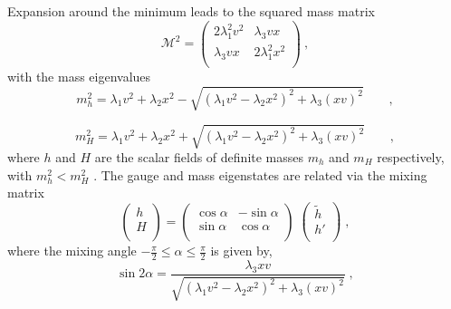\newline
Expansion around the minimum leads to the squared mass matrix
\newline
\begin{equation}
{\mathcal M}^2 = \left(
\begin{array}{cc}
2 \lambda_1^2 v^2 & \lambda_3 vx  \\
\lambda_3 vx & 2 \lambda_1^2 x^2 \\
\end{array}
\right)
\: , \end{equation}
\newline
with the mass eigenvalues
\begin{equation}
 m_h^2=  \lambda_1 v^2 + \lambda_2 x^2 -\sqrt{(\lambda_1 v^2 - \lambda_2 x^2)^2 +\lambda_3 (xv)^2 } \qquad,  \end{equation}

\begin{equation}
 m_H^2=  \lambda_1 v^2 + \lambda_2 x^2 +\sqrt{(\lambda_1 v^2 - \lambda_2 x^2)^2 +\lambda_3 (xv)^2 } \qquad,  \end{equation}
\newline
where $h$ and $H$ are the scalar fields of definite masses $m_h$ and $m_H$ respectively, with $m_h^2 < m_H^2$ .
The gauge and mass eigenstates are related via the mixing matrix
\newline
\begin{equation}
\left(
\begin{array}{c}
h   \\
H \\
\end{array}
\right)
=
\left(
\begin{array}{cc}
\cos \alpha & -\sin \alpha   \\
\sin \alpha & \cos \alpha \\
\end{array}
\right)
\;
\left(
\begin{array}{c}
\tilde{h}   \\
h' \\
\end{array}
\right)
\; , \end{equation}
\newline
where the mixing angle $ - \frac{\pi}{2} \leq \alpha \leq  \frac{\pi}{2} $ is given by,
\newline
\newline
\begin{equation}
\sin 2 \alpha= \frac{\lambda_3 xv}{\sqrt{(\lambda_1 v^2 - \lambda_2 x^2)^2 +\lambda_3 (xv)^2 } } \; , \end{equation}

